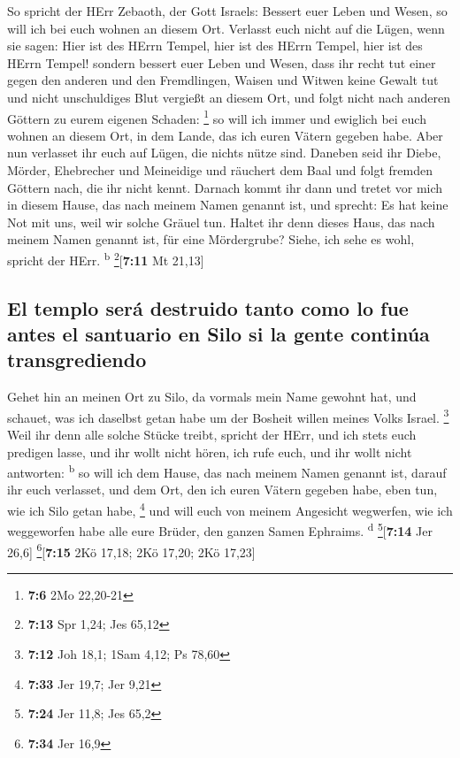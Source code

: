  So spricht der HErr Zebaoth, der Gott Israels: Bessert
euer Leben und Wesen, so will ich bei euch wohnen an diesem Ort.
 Verlasst euch nicht auf die Lügen, wenn sie sagen: Hier
ist des HErrn Tempel, hier ist des HErrn Tempel, hier ist des HErrn
Tempel!  sondern bessert euer Leben und Wesen, dass ihr
recht tut einer gegen den anderen  und den Fremdlingen,
Waisen und Witwen keine Gewalt tut und nicht unschuldiges Blut vergießt
an diesem Ort, und folgt nicht nach anderen Göttern zu eurem eigenen
Schaden: \footnote{\textbf{7:6} 2Mo 22,20-21}  so will ich
immer und ewiglich bei euch wohnen an diesem Ort, in dem Lande, das ich
euren Vätern gegeben habe.  Aber nun verlasset ihr euch
auf Lügen, die nichts nütze sind.  Daneben seid ihr Diebe,
Mörder, Ehebrecher und Meineidige und räuchert dem Baal und folgt
fremden Göttern nach, die ihr nicht kennt.  Darnach kommt
ihr dann und tretet vor mich in diesem Hause, das nach meinem Namen
genannt ist, und sprecht: Es hat keine Not mit uns, weil wir solche
Gräuel tun.  Haltet ihr denn dieses Haus, das nach meinem
Namen genannt ist, für eine Mördergrube? Siehe, ich sehe es wohl,
spricht der HErr. \textsuperscript{b} \footnote{\textbf{7:13} Spr 1,24;
  Jes 65,12}{[}\textbf{7:11} Mt 21,13{]}

\hypertarget{el-templo-seruxe1-destruido-tanto-como-lo-fue-antes-el-santuario-en-silo-si-la-gente-continuxfaa-transgrediendo}{%
\subsection{El templo será destruido tanto como lo fue antes el
santuario en Silo si la gente continúa
transgrediendo}\label{el-templo-seruxe1-destruido-tanto-como-lo-fue-antes-el-santuario-en-silo-si-la-gente-continuxfaa-transgrediendo}}

 Gehet hin an meinen Ort zu Silo, da vormals mein Name
gewohnt hat, und schauet, was ich daselbst getan habe um der Bosheit
willen meines Volks Israel. \footnote{\textbf{7:12} Joh 18,1; 1Sam 4,12;
  Ps 78,60}  Weil ihr denn alle solche Stücke treibt,
spricht der HErr, und ich stets euch predigen lasse, und ihr wollt nicht
hören, ich rufe euch, und ihr wollt nicht antworten: \textsuperscript{b}
 so will ich dem Hause, das nach meinem Namen genannt
ist, darauf ihr euch verlasset, und dem Ort, den ich euren Vätern
gegeben habe, eben tun, wie ich Silo getan habe, \footnote{\textbf{7:33}
  Jer 19,7; Jer 9,21}  und will euch von meinem Angesicht
wegwerfen, wie ich weggeworfen habe alle eure Brüder, den ganzen Samen
Ephraims. \textsuperscript{d} \footnote{\textbf{7:24} Jer 11,8; Jes 65,2}{[}\textbf{7:14}
Jer 26,6{]} \footnote{\textbf{7:34} Jer 16,9}{[}\textbf{7:15} 2Kö 17,18;
2Kö 17,20; 2Kö 17,23{]}

